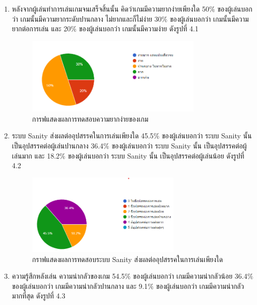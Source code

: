 \begin{enumerate}
    \item หลังจากผู้เล่นทำการเล่นเกมจนเสร็จสิ้นนั้น คิดว่าเกมมีความยากง่ายเพียงใด 50$\%$ ของผู้เล่นบอกว่า เกมนั้นมีความยากระดับปานกลาง ไม่ยากและก็ไม่ง่าย 30$\%$ ของผู้เล่นบอกว่า เกมนั้นมีความยากต่อการเล่น และ 20$\%$ ของผู้เล่นบอกว่า เกมนั้นมีความง่าย ดังรูปที่ 4.1
    \begin{figure}
        \centering
        \includegraphics[width=0.8\textwidth, height=0.20\textheight]{Images/Graph difficult.png}
        \caption[การฟแสดงผลการทดสอบความยากง่ายของเกม]{การฟแสดงผลการทดสอบความยากง่ายของเกม}
    \end{figure}
    \item ระบบ Sanity ส่งผลต่ออุปสรรคในการเล่นเพียงใด 45.5$\%$ ของผู้เล่นบอกว่า ระบบ Sanity นั้น เป็นอุปสรรคต่อผู้เล่นปานกลาง 36.4$\%$ ของผู้เล่นบอกว่า ระบบ Sanity นั้น เป็นอุปสรรคต่อผู้เล่นมาก และ 18.2$\%$ ของผู้เล่นบอกว่า ระบบ Sanity นั้น เป็นอุปสรรคต่อผู้เล่นน้อย ดังรูปที่ 4.2
    \begin{figure}
        \centering
        \includegraphics[width=0.7\textwidth, height=0.20\textheight]{Images/Graph Sanity.png}
        \caption[กราฟแสดงผลการทดสอบระบบ Sanity ส่งผลต่ออุปสรรคในการเล่นเพียงใด]{กราฟแสดงผลการทดสอบระบบ Sanity ส่งผลต่ออุปสรรคในการเล่นเพียงใด}
    \end{figure}
    \item ความรู้สึกหลังเล่น ความน่ากลัวของเกม 54.5$\%$ ของผู้เล่นบอกว่า เกมมีความน่ากลัวน้อย 36.4$\%$ ของผู้เล่นบอกว่า เกมมีความน่ากลัวปานกลาง และ 9.1$\%$ ของผู้เล่นบอกว่า เกมมีความน่ากลัวมากที่สุด ดังรูปที่ 4.3

\end{enumerate}
